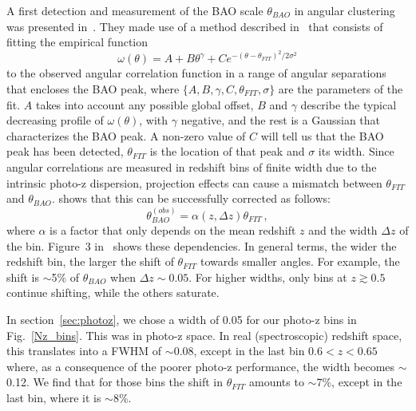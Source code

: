 A first detection and measurement of the BAO scale $\theta_{BAO}$ in angular clustering was presented in~\citet{Carnero2012}. They made use of a method described in~\citet{Sanchez2011} that consists of fitting the empirical function
\begin{equation}
\omega(\theta) = A + B\theta^\gamma + Ce^{-(\theta-\theta_{FIT})^2 /2\sigma^2}
\label{bao_fit}
\end{equation}
to the observed angular correlation function in a range of angular separations that encloses the BAO peak, where $\lbrace A,B,\gamma,C,\theta_{FIT},\sigma \rbrace$ are the parameters of the fit. $A$ takes into account any possible global offset, $B$ and $\gamma$ describe the typical decreasing profile of $\omega(\theta)$, with $\gamma$ negative, and the rest is a Gaussian that characterizes the BAO peak. A non-zero value of $C$ will tell us that the BAO peak has been detected, $\theta_{FIT}$ is the location of that peak and $\sigma$ its width. Since angular correlations are measured in redshift bins of finite width due to the intrinsic photo-z dispersion, projection effects can cause a mismatch between $\theta_{FIT}$ and $\theta_{BAO}$. \citet{Sanchez2011} shows that this can be successfully corrected as follows:
\begin{equation}
\theta^{(obs)}_{BAO} = \alpha(z,\Delta z) \theta_{FIT} \, ,
\end{equation}
where $\alpha$ is a factor that only depends on the mean redshift $z$ and the width $\Delta z$ of the bin. Figure~3 in~\citet{Sanchez2011} shows these dependencies. In general terms, the wider the redshift bin, the larger the shift of $\theta_{FIT}$ towards smaller angles. For example, the shift is $\sim$5\% of $\theta_{BAO}$ when $\Delta z \sim 0.05$. For higher widths, only bins at $z\gtrsim0.5$ continue shifting, while the others saturate. 

In section~\ref{sec:photoz}, we chose a width of 0.05 for our photo-z bins in Fig.~\ref{Nz_bins}. This was in photo-z space. In real (spectroscopic) redshift space, this translates into a FWHM of $\sim$0.08, except in the last bin $0.6<z<0.65$ where, as a consequence of the poorer photo-z performance, the width becomes $\sim$0.12. We find that for those bins the shift in $\theta_{FIT}$ amounts to $\sim$7\%, except in the last bin, where it is $\sim$8\%.

